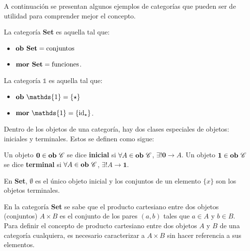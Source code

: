 A continuación se presentan algunos ejemplos de categorías que pueden ser de utilidad para comprender mejor el concepto.

\begin{ejemplo}
La categoría \textbf{Set} es aquella tal que:
\begin{itemize}[noitemsep,label=$\blacktriangleright$]
	\item $\text{\bf ob Set} = \text{conjuntos}$
	\item $\text{\bf mor Set} = \text{funciones}$. 
\end{itemize}
\end{ejemplo}
\begin{ejemplo}
La categoría $\mathds{1}$ es aquella tal que:
\begin{itemize}[noitemsep,label=$\blacktriangleright$]
	\item $\text{\bf ob} \ \mathds{1} = \{\star\}$
	\item $\text{\bf mor} \ \mathds{1} = \{\text{id}_{\star}\}$. 
\end{itemize}
\end{ejemplo}

Dentro de los objetos de una categoría, hay dos clases especiales de objetos: iniciales y terminales. Estos se definen como sigue:

\begin{definition}
Un objeto $\mathbf{0} \in \text{\bf ob} \ \mathscr{C}$ se dice \textbf{inicial} si $\forall A \in \text{\bf ob} \ \mathscr{C}$, $\exists! \mathbf{0} \rightarrow A$. 
Un objeto $\mathbf{1} \in \text{\bf ob} \ \mathscr{C}$ se dice \textbf{terminal} si $\forall A \in \text{\bf ob} \ \mathscr{C}$, $\exists! A \rightarrow \mathbf{1}$.
\end{definition}

\begin{ejemplo} 
En \textbf{Set}, $\emptyset$ es el único objeto inicial y los conjuntos de un elemento $\{x\}$ son los objetos terminales.
\end{ejemplo}

En la categoría \textbf{Set} se sabe que el producto cartesiano entre dos objetos (conjuntos) $A \times B$ es el conjunto de los pares $(a,b)$ tales que $a \in A$ y $b \in B$. Para definir el concepto de producto cartesiano entre dos objetos $A$ y $B$ de una categoría cualquiera, es necesario caracterizar a $A \times B$ sin hacer referencia a sus elementos. 

